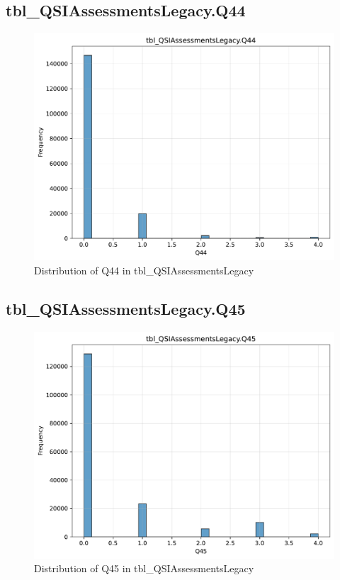 \subsection{tbl\_QSIAssessmentsLegacy.Q44}

\begin{figure}[htbp]
\centering
\includegraphics[width=\textwidth]{figures/dbo_tbl_QSIAssessmentsLegacy_Q44.pdf}
\caption{Distribution of Q44 in tbl\_QSIAssessmentsLegacy}
\end{figure}\newpage

\subsection{tbl\_QSIAssessmentsLegacy.Q45}

\begin{figure}[htbp]
\centering
\includegraphics[width=\textwidth]{figures/dbo_tbl_QSIAssessmentsLegacy_Q45.pdf}
\caption{Distribution of Q45 in tbl\_QSIAssessmentsLegacy}
\end{figure}\newpage

